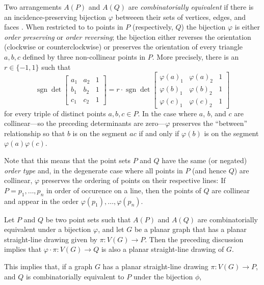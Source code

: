 \documentclass{patmorin}
\DeclareMathOperator{\sgn}{sgn}
\begin{document}
\begin{enumerate}
Two arrangements $A(P)$ and $A(Q)$ are \emph{combinatorially equivalent}
if there is an incidence-preserving bijection $\varphi$ betweeen their
sets of vertices, edges, and faces \cite[Page~4]{grunbaum:arrangements}.
When restricted to to points in $P$ (respectively, $Q$) the
bijection $\varphi$ is either \emph{order preserving} or \emph{order
reversing};  the bijection either reverses the orientation (clockwise or
counterclockwise) or preserves the orientation of every triangle $a,b,c$
defined by three non-collinear points in $P$.  More precisely, there is
an $r\in\{-1,1\}$ such that
\[
    \sgn\det \left[\begin{array}{ccc}
       a_1 & a_2 & 1 \\
       b_1 & b_2 & 1 \\
       c_1 & c_2 & 1 
    \end{array}\right]
      =
    r\cdot \sgn\det \left[\begin{array}{ccc}
       \varphi(a)_1 & \varphi(a)_2 & 1 \\
       \varphi(b)_1 & \varphi(b)_2 & 1 \\
       \varphi(c)_1 & \varphi(c)_2 & 1 
    \end{array}\right]
\]
for every triple of distinct points $a,b,c\in P$.  In the case where
$a$, $b$, and $c$ are collinear---so the preceding determinants are
zero---$\varphi$ preserves the ``between'' relationship so that $b$ is
on the segment $ac$ if and only if $\varphi(b)$ is on the segment
$\varphi(a)\varphi(c)$.

Note that this means that the point sets $P$ and $Q$ have the same
(or negated) \emph{order type} \cite{goodman.pollack} and, in the
degenerate case where all points in $P$ (and hence $Q$) are collinear,
$\varphi$ preserves the ordering of points on their respective lines: If
$P=p_1,\ldots,p_n$ in order of occurence on a line, then the points of $Q$
are collinear and appear in the order $\varphi(p_1),\ldots,\varphi(p_n)$.

Let $P$ and $Q$ be two point sets such that $A(P)$ and $A(Q)$ are
combinatorially equivalent under a bijection $\varphi$, and let $G$
be a planar graph that has a planar straight-line drawing given by
$\pi\colon V(G)\to P$.  Then the preceding discussion implies that
$\varphi\cdot\pi\colon V(G)\to Q$  is also a planar straight-line drawing
of $G$.



This implies that, if a graph $G$ has a planar straight-line drawing $\pi\colon V(G)\to P$, and $Q$ is combinatorially equivalent to $P$ under the bijection $\phi$, 



\end{enumerate}
\end{document}
